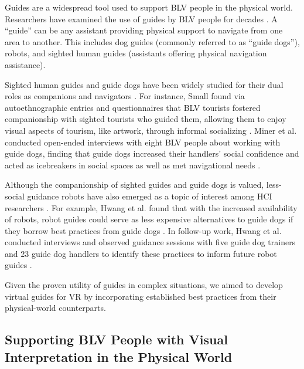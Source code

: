 Guides are a widespread tool used to support BLV people in the physical world. Researchers have examined the use of guides by BLV people for decades \cite{kayukawa2020blindpilot, garaj2003pedestrian, guerreiro2019cabot, lannan2019campus, jagt2023familiar}. A “guide” can be any assistant providing physical support to navigate from one area to another. This includes dog guides (commonly referred to as “guide dogs”), robots, and sighted human guides (assistants offering physical navigation assistance). 

Sighted human guides and guide dogs have been widely studied for their dual roles as companions and navigators \cite{ball2022runners, miner2001dogguide, vincenzi2021interdependence, small2015interconnecting, macpherson2016guiding}. For instance, Small found via autoethnographic entries and questionnaires that BLV tourists fostered companionship with sighted tourists who guided them, allowing them to enjoy visual aspects of tourism, like artwork, through informal socializing \cite{small2015interconnecting}. Miner et al. conducted open-ended interviews with eight BLV people about working with guide dogs, finding that guide dogs increased their handlers’ social confidence and acted as icebreakers in social spaces as well as met navigational needs \cite{miner2001dogguide}.

Although the companionship of sighted guides and guide dogs is valued, less-social guidance robots have also emerged as a topic of interest among HCI researchers \cite{kayukawa2020blindpilot, guerreiro2019cabot, azenkot2016servicerobots, kayukawa2023museum, bonani2018robots, hwang2024lessons, hwang2024towards}. For example, Hwang et al. found that with the increased availability of robots, robot guides could serve as less expensive alternatives to guide dogs if they borrow best practices from guide dogs \cite{hwang2024lessons}. In follow-up work, Hwang et al. conducted interviews and observed guidance sessions with five guide dog trainers and 23 guide dog handlers to identify these practices to inform future robot guides \cite{hwang2024towards}.

Given the proven utility of guides in complex situations, we aimed to develop virtual guides for VR by incorporating established best practices from their physical-world counterparts.

\subsection{Supporting BLV People with Visual Interpretation in the Physical World}

